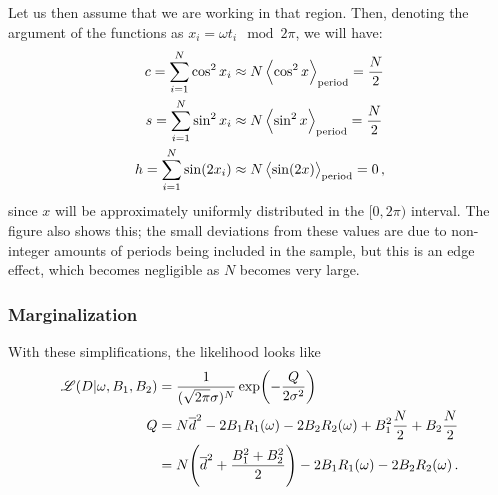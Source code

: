 \documentclass[main.tex]{subfiles}
\begin{document}

Let us then assume that we are working in that region. Then, denoting the argument of the functions as \(x_i = \omega t_i \mod 2 \pi \), we will have: 
%
\begin{align}
c = \sum _{i=1}^{N} \cos^2 x_i &\approx N \expval{\cos^2 x}_{\text{period}} = \frac{N}{2} \\
s = \sum _{i=1}^{N} \sin^2 x_i &\approx N \expval{\sin^2 x}_{\text{period}} = \frac{N}{2} \\
h = \sum _{i=1}^{N} \sin (2 x_i) &\approx N \expval{\sin (2x)}_{\text{period}} = 0 
\,,
\end{align}
%
since \(x\) will be approximately uniformly distributed in the \([0, 2\pi )\) interval.
The figure also shows this; the small deviations from these values are due to non-integer amounts of periods being included in the sample, but this is an edge effect, which becomes negligible as \(N\) becomes very large.

\subsubsection{Marginalization}

With these simplifications, the likelihood looks like 
%
\begin{align}
\mathscr{L}(D | \omega , B_1 , B_2 ) &= \frac{1}{(\sqrt{2 \pi } \sigma )^{N}}
\exp(- \frac{Q}{2 \sigma^2})  \\
Q &= 
N \overline{d}^2 - 2 B_1 R_1(\omega ) -2 B_2 R_2(\omega ) + B_1^2 \frac{N}{2} + B_2 \frac{N}{2}  \\
&= N \qty(\overline{d}^2 + \frac{B_1^2 + B_2^2}{2}) - 2 B_1 R_1(\omega ) - 2 B_2 R_2(\omega )
\,.
\end{align}
\end{document}
